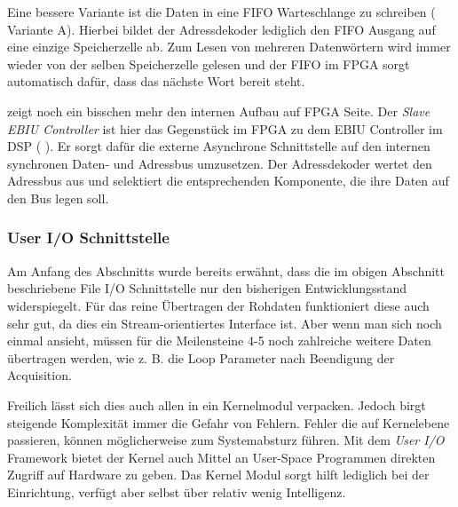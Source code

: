 Eine bessere Variante ist die Daten in eine \gls{FIFO} Warteschlange zu schreiben ( Variante A). Hierbei bildet der Adressdekoder lediglich den FIFO Ausgang auf eine einzige Speicherzelle ab. Zum Lesen von mehreren Datenwörtern wird immer wieder von der selben Speicherzelle gelesen und der FIFO im FPGA sorgt automatisch dafür, dass das nächste Wort bereit steht.

 zeigt noch ein bisschen mehr den internen Aufbau auf FPGA Seite. Der \emph{Slave EBIU Controller} ist hier das Gegenstück im FPGA zu dem EBIU Controller im DSP ( ). Er sorgt dafür die externe Asynchrone Schnittstelle auf den internen synchronen Daten- und Adressbus umzusetzen. Der Adressdekoder wertet den Adressbus aus und selektiert die entsprechenden Komponente, die ihre Daten auf den Bus legen soll.




\subsubsection{User I/O Schnittstelle}
Am Anfang des Abschnitts wurde bereits erwähnt, dass die im obigen Abschnitt beschriebene File I/O Schnittstelle nur den bisherigen Entwicklungsstand widerspiegelt. Für das reine Übertragen der Rohdaten funktioniert diese auch sehr gut, da dies ein Stream-orientiertes Interface ist. Aber wenn man sich noch einmal  ansieht, müssen für die Meilensteine 4-5 noch zahlreiche weitere Daten übertragen werden, wie z. B. die Loop Parameter nach Beendigung der Acquisition.

Freilich lässt sich dies auch allen in ein Kernelmodul verpacken. Jedoch birgt steigende Komplexität immer die Gefahr von Fehlern. Fehler die auf Kernelebene passieren, können möglicherweise zum Systemabsturz führen. Mit dem \emph{User I/O} Framework bietet der Kernel auch Mittel an User-Space Programmen direkten Zugriff auf Hardware zu geben. Das Kernel Modul sorgt hilft lediglich bei der Einrichtung, verfügt aber selbst über relativ wenig Intelligenz. 

